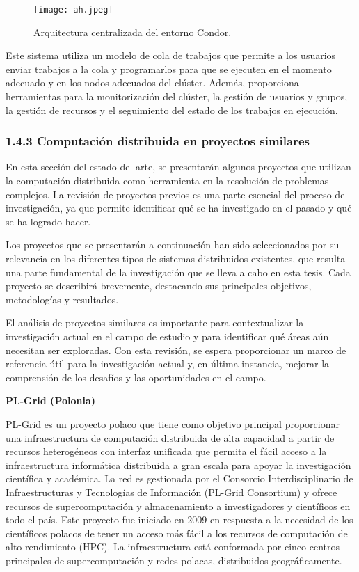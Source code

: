 \begin{spacing}{1.5}
  \begin{figure}[h]
    \centering
    \texttt{[image: ah.jpeg]}
    \caption{Arquitectura centralizada del entorno Condor.}
    \label{fig:etiqueta}
  \end{figure}

  Este sistema utiliza un modelo de cola de trabajos que permite a los usuarios
  enviar trabajos a la cola y programarlos para que se ejecuten en el momento
  adecuado y en los nodos adecuados del clúster. Además, proporciona herramientas
  para la monitorización del clúster, la gestión de usuarios y grupos, la gestión
  de recursos y el seguimiento del estado de los trabajos en ejecución.
  \cite{DEF-HTCONDOR}

  \subsubsection{1.4.3 Computación distribuida en proyectos similares}

  En esta sección del estado del arte, se presentarán algunos proyectos que
  utilizan la computación distribuida como herramienta en la resolución de
  problemas complejos. La revisión de proyectos previos es una parte esencial del
  proceso de investigación, ya que permite identificar qué se ha investigado en
  el pasado y qué se ha logrado hacer.

  Los proyectos que se presentarán a continuación han sido seleccionados por su
  relevancia en los diferentes tipos de sistemas distribuidos existentes, que
  resulta una parte fundamental de la investigación que se lleva a cabo en esta
  tesis. Cada proyecto se describirá brevemente, destacando sus principales
  objetivos, metodologías y resultados.

  El análisis de proyectos similares es importante para contextualizar la
  investigación actual en el campo de estudio y para identificar qué áreas aún
  necesitan ser exploradas. Con esta revisión, se espera proporcionar un marco de
  referencia útil para la investigación actual y, en última instancia, mejorar la
  comprensión de los desafíos y las oportunidades en el campo.

  \textbf{PL-Grid (Polonia)}

  PL-Grid es un proyecto polaco que tiene como objetivo principal proporcionar
  una infraestructura de computación distribuida de alta capacidad a partir de
  recursos heterogéneos con interfaz unificada que permita el fácil acceso a la
  infraestructura informática distribuida a gran escala para apoyar la
  investigación científica y académica. La red es gestionada por el Consorcio
  Interdisciplinario de Infraestructuras y Tecnologías de Información (PL-Grid
  Consortium) y ofrece recursos de supercomputación y almacenamiento a
  investigadores y científicos en todo el país. Este proyecto fue iniciado en
  2009 en respuesta a la necesidad de los científicos polacos de tener un acceso
  más fácil a los recursos de computación de alto rendimiento (HPC). La
  infraestructura está conformada por cinco centros principales de
  supercomputación y redes polacas, distribuidos geográficamente.


\end{spacing}
